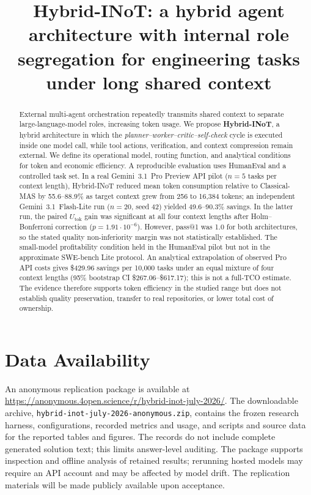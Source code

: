 \documentclass[acmsmall,screen,review,anonymous]{acmart}
\begin{document}
\title[Hybrid-INoT]{Hybrid-INoT: a hybrid agent architecture with internal role segregation for engineering tasks under long shared context}
\begin{abstract}
External multi-agent orchestration repeatedly transmits shared context to separate large-language-model roles, increasing token usage. We propose \textbf{Hybrid-INoT}, a hybrid architecture in which the \textit{planner--worker--critic--self-check} cycle is executed inside one model call, while tool actions, verification, and context compression remain external. We define its operational model, routing function, and analytical conditions for token and economic efficiency. A reproducible evaluation uses HumanEval and a controlled task set. In a real Gemini~3.1~Pro Preview API pilot ($n=5$ tasks per context length), Hybrid-INoT reduced mean token consumption relative to Classical-MAS by 55.6--88.9\% as target context grew from 256 to 16,384 tokens; an independent Gemini~3.1~Flash-Lite run ($n=20$, seed 42) yielded 49.6--90.3\% savings. In the latter run, the paired $U_{\mathrm{tok}}$ gain was significant at all four context lengths after Holm--Bonferroni correction ($p=1.91\cdot10^{-6}$). However, pass@1 was 1.0 for both architectures, so the stated quality non-inferiority margin was not statistically established. The small-model profitability condition held in the HumanEval pilot but not in the approximate SWE-bench Lite protocol. An analytical extrapolation of observed Pro API costs gives \$429.96 savings per 10,000 tasks under an equal mixture of four context lengths (95\% bootstrap CI \$267.06--\$617.17); this is not a full-TCO estimate. The evidence therefore supports token efficiency in the studied range but does not establish quality preservation, transfer to real repositories, or lower total cost of ownership.
\end{abstract}
\maketitle

\section*{Data Availability}
An anonymous replication package is available at \url{https://anonymous.4open.science/r/hybrid-inot-july-2026/}. The downloadable archive, \texttt{hybrid-inot-july-2026-anonymous.zip}, contains the frozen research harness, configurations, recorded metrics and usage, and scripts and source data for the reported tables and figures. The records do not include complete generated solution text; this limits answer-level auditing. The package supports inspection and offline analysis of retained results; rerunning hosted models may require an API account and may be affected by model drift. The replication materials will be made publicly available upon acceptance.
\nocite{austin2021mbpp,goncalves2011,ko2007,parnin2011}


\end{document}
